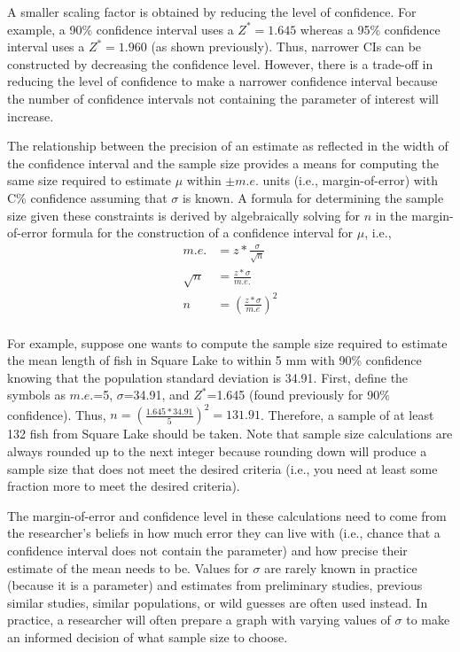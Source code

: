 \documentclass[10pt,openany]{book}\usepackage[]{graphicx}\usepackage[]{color}
\begin{document}
A smaller scaling factor is obtained by reducing the level of confidence.  For example, a 90\% confidence interval uses a $Z^{*}=1.645$ whereas a 95\% confidence interval uses a $Z^{*}=1.960$ (as shown previously).  Thus, narrower CIs can be constructed by decreasing the confidence level.  However, there is a trade-off in reducing the level of confidence to make a narrower confidence interval because the number of confidence intervals not containing the parameter of interest will increase.


The relationship between the precision of an estimate as reflected in the width of the confidence interval and the sample size provides a means for computing the same size required to estimate $\mu$ within $\pm m.e.$ units (i.e., margin-of-error) with C\% confidence assuming that $\sigma$ is known.  A formula for determining the sample size given these constraints is derived by algebraically solving for $n$ in the margin-of-error formula for the construction of a confidence interval for $\mu$, i.e.,
\[
  \begin{split}
    m.e. &= z*\frac{\sigma}{\sqrt{n}} \\
    \sqrt{n} &= \frac{z*\sigma}{m.e.} \\
    n &= \left(\frac{z*\sigma}{m.e}\right)^{2} \\
  \end{split}
\]

For example, suppose one wants to compute the sample size required to estimate the mean length of fish in Square Lake to within 5 mm with 90\% confidence knowing that the population standard deviation is 34.91.  First, define the symbols as $m.e.$=5, $\sigma$=34.91, and $Z^{*}$=1.645 (found previously for 90\% confidence).  Thus, $n = \left(\frac{1.645*34.91}{5}\right)^{2} = 131.91$.  Therefore, a sample of at least 132 fish from Square Lake should be taken.  Note that sample size calculations are always rounded up to the next integer because rounding down will produce a sample size that does not meet the desired criteria (i.e., you need at least some fraction more to meet the desired criteria).


The margin-of-error and confidence level in these calculations need to come from the researcher's beliefs in how much error they can live with (i.e., chance that a confidence interval does not contain the parameter) and how precise their estimate of the mean needs to be.  Values for $\sigma$ are rarely known in practice (because it is a parameter) and estimates from preliminary studies, previous similar studies, similar populations, or wild guesses are often used instead.  In practice, a researcher will often prepare a graph with varying values of $\sigma$  to make an informed decision of what sample size to choose.
\end{document}
